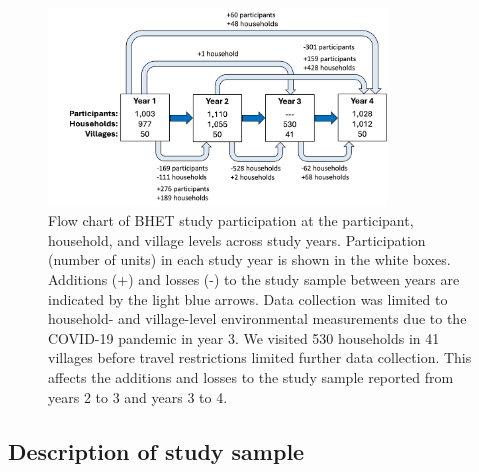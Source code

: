 \documentclass[
  letterpaper,
  DIV=11,
  numbers=noendperiod]{scrartcl}
\begin{document}
\begin{figure}[H]

{\centering \includegraphics[width=0.8\textwidth,height=\textheight]{images/participation-flow-chart-Mar18.png}

}

\caption{\label{fig-flowchart}Flow chart of BHET study participation at
the participant, household, and village levels across study years.
Participation (number of units) in each study year is shown in the white
boxes. Additions (+) and losses (-) to the study sample between years
are indicated by the light blue arrows. Data collection was limited to
household- and village-level environmental measurements due to the
COVID-19 pandemic in year 3. We visited 530 households in 41 villages
before travel restrictions limited further data collection. This affects
the additions and losses to the study sample reported from years 2 to 3
and years 3 to 4.}

\end{figure}

\hypertarget{description-of-study-sample}{%
\subsection{Description of study
sample}\label{description-of-study-sample}}
\end{document}
